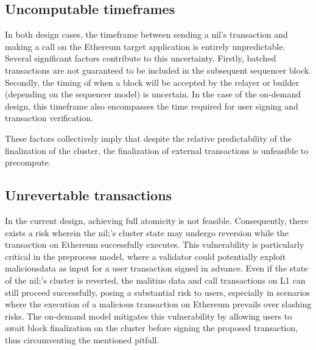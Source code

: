 \subsection{Uncomputable timeframes}

In both design cases, the timeframe between sending a nil's transaction and making a call on the 
Ethereum target application is entirely unpredictable. Several significant factors contribute to 
this uncertainty. Firstly, batched transactions are not guaranteed to be included in the 
subsequent sequencer block. Secondly, the timing of when a block will be accepted by the relayer 
or builder (depending on the sequencer model) is uncertain. In the case of the on-demand design, 
this timeframe also encompasses the time required for user signing and transaction verification.

These factors collectively imply that despite the relative predictability of the finalization of 
the cluster, the finalization of external transactions is unfeasible to precompute.


\subsection{Unrevertable transactions}

In the current design, achieving full atomicity is not feasible. Consequently, there exists a 
risk wherein the nil;'s cluster state may undergo reversion while the transaction on Ethereum 
successfully executes. This vulnerability is particularly critical in the preprocess model, 
where a validator could potentially exploit maliciousdata as input for a user transaction signed 
in advance. Even if the state of the nil;'s cluster is reverted, the malitius data and call 
transactions on L1 can still proceed successfully, posing a substantial risk to users, 
especially in scenarios where the execution of a malicious transaction on Ethereum prevails over 
slashing risks. The on-demand model mitigates this vulnerability by allowing users to await 
block finalization on the cluster before signing the proposed transaction, thus circumventing 
the mentioned pitfall.
